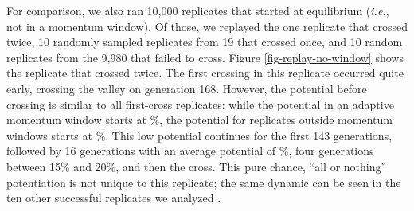 For comparison, we also ran 10,000 replicates that started at equilibrium (\textit{i.e.}, not in a momentum window).
Of those, we replayed the one replicate that crossed twice, 10 randomly sampled replicates from 19 that crossed once, and 10 random replicates from the 9,980 that failed to cross. 
Figure \ref{fig-replay-no-window} shows the replicate that crossed twice. 
The first crossing in this replicate occurred quite early, crossing the valley on generation 168. 
However, the potential before crossing is similar to all first-cross replicates: while the potential in an adaptive momentum window starts at \%, the potential for replicates outside momentum windows starts at \%. 
This low potential continues for the first 143 generations, followed by 16 generations with an average potential of \%, four generations between 15\% and 20\%, and then the cross. 
This pure chance, ``all or nothing'' potentiation is not unique to this replicate; the same dynamic can be seen in the ten other successful replicates we analyzed \citep{austin_ferguson_2024_11507982}.



